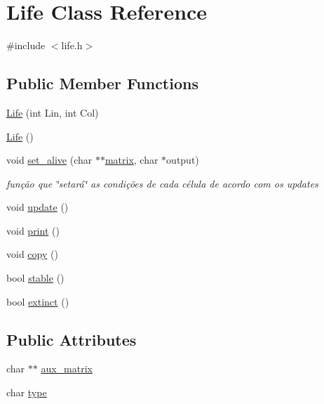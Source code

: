 \hypertarget{classLife}{}\section{Life Class Reference}
\label{classLife}


{\ttfamily \#include $<$life.\+h$>$}

\subsection*{Public Member Functions}
\begin{DoxyCompactItemize}
\item 
\hyperlink{classLife_a08477d04bc4bf98837c9e37b041f2d35}{Life} (int Lin, int Col)
\item 
\hyperlink{classLife_a6de2a371f6f778f8b4938d219390b746}{Life} ()
\item 
void \hyperlink{classLife_a6ccd51752d8955b6171547fa57b14db3}{set\+\_\+alive} (char $\ast$$\ast$\hyperlink{classLife_a2f62f4ff6ec85d88de087aa9fd228054}{matrix}, char $\ast$output)
\begin{DoxyCompactList}\small\item\em função que \char`\"{}setará\char`\"{} as condições de cada célula de acordo com os updates \end{DoxyCompactList}\item 
void \hyperlink{classLife_a0e00f2735584f3ddebb397742b520d3b}{update} ()
\item 
void \hyperlink{classLife_a502bd46fefb24950e64865ce87c4b670}{print} ()
\item 
void \hyperlink{classLife_a1e7183d91f5c7f8935915daaf33a5f93}{copy} ()
\item 
bool \hyperlink{classLife_a49c95a25d20e9eabf940305f99bcf2c3}{stable} ()
\item 
bool \hyperlink{classLife_a988f58733428b7957d52ca85fecdb21d}{extinct} ()
\end{DoxyCompactItemize}
\subsection*{Public Attributes}
\begin{DoxyCompactItemize}
\item 
char $\ast$$\ast$ \hyperlink{classLife_a207d51f8631df0fbda12a23e2b6b112f}{aux\+\_\+matrix}
\item 
char \hyperlink{classLife_a32121ce5b98c0b7d8b1b0f2a5f1114aa}{type}
\end{DoxyCompactItemize}
